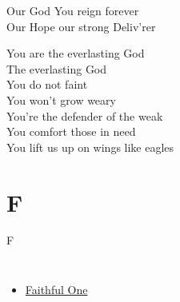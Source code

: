 \documentclass{beamer}
\begin{document}
{\hypertarget{Everlasting God['Strength will rise']Pre}{}
\begin{frame}{}
\fontsize{ 18 }{ 23 }\selectfont

Our God You reign forever\\ 
Our Hope our strong Deliv'rer 

\end{frame}

\hypertarget{Everlasting God['Strength will rise']C}{}
\begin{frame}{}
\fontsize{ 18 }{ 23 }\selectfont

You are the everlasting God\\ 
The everlasting God\\ 
You do not faint\\ 
You won't grow weary\\ 
You're the defender of the weak\\ 
You comfort those in need\\ 
You lift us up on wings like eagles 

\end{frame}

}
\section{F}

\begin{frame}{F}
\begin{columns}
    \begin{itemize}
    \item \hyperlink{Faithful One[]V}{Faithful One }
\end{itemize}


\end{columns}

\end{frame}
\end{document}
